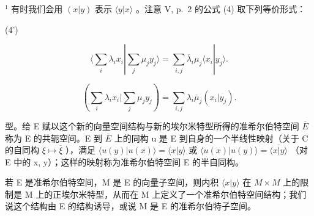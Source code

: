 \(^{1}\) 有时我们会用 \((x|y)\) 表示 \(\langle y|x\rangle\) 。注意 V, p.~2 的公式 (4) 取下列等价形式：

(4')

\[
\langle \sum_ {i} \lambda_ {i} x _ {i} | \sum_ {j} \mu_ {j} y _ {j} \rangle = \sum_ {i, j} \overline {{{{\lambda}}}} _ {i} \mu_ {j} \langle x _ {i} | y _ {j} \rangle .\tag{4"}
\]

\[
(\sum_ {i} \lambda_ {i} x _ {i} | \sum_ {j} \mu_ {j} y _ {j}) = \sum_ {i, j} \lambda_ {i} \overline {{\mu}} _ {j} (x _ {i} | y _ {j}).
\]

型。给 E 赋以这个新的向量空间结构与新的埃尔米特型所得的准希尔伯特空间 \(\overline{E}\) 称为 E 的共轭空间。E 到 \(\overline{E}\) 上的同构 u 是 E 到自身的一个半线性映射（关于 C 的自同构 \(\xi \mapsto \overline{\xi}\) ），满足 \(\langle u(y)|u(x)\rangle = \langle x|y\rangle\) 或 \(\langle u(x)|u(y)\rangle = \overline{\langle x|y\rangle}\) （对 E 中的 x, y）；这样的映射称为准希尔伯特空间 E 的半自同构。

若 E 是准希尔伯特空间，M 是 E 的向量子空间，则内积 \(\langle x|y\rangle\) 在 \(M \times M\) 上的限制是 M 上的正埃尔米特型，从而在 M 上定义了一个准希尔伯特空间结构；我们说这个结构由 E 的结构诱导，或说 M 是 E 的准希尔伯特子空间。


